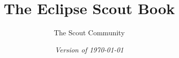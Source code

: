 
\author{
  The Scout Community
}
\title{\Huge\bf The Eclipse Scout Book}
\ifpdf
  \isodate
\fi
\date{\emph{Version of \today}}
\maketitle

